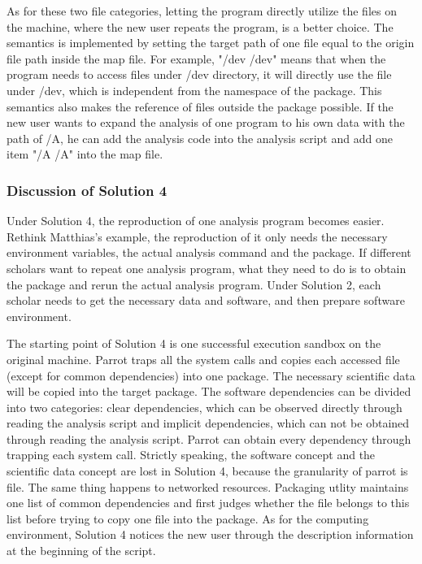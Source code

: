 \documentclass{acm_proc_article-sp}
\begin{document}
As for these two file categories, letting
the program directly utilize the files on the machine, where the new user
repeats the program, is a better choice. The semantics is implemented by
setting the target path of one file equal to the origin file path inside the
map file. For example, "/dev /dev" means that when the program needs to access
files under /dev directory, it will directly use the file under /dev, which is
independent from the namespace of the package. This semantics also makes the
reference of files outside the package possible. If the new user wants to
expand the analysis of one program to his own data with the path of /A, he can add the analysis
code into the analysis script and add one item "/A /A" into the map file.


\subsubsection{Discussion of Solution 4} 

Under Solution 4, the reproduction of one analysis program becomes easier.
Rethink Matthias's example, the reproduction of it only needs
the necessary environment variables, the actual analysis command
and the package. If different scholars want to repeat one analysis program,
what they need to do is to obtain the package and rerun the actual analysis
program. Under Solution 2, each scholar needs to get the necessary data and
software, and then prepare software environment. 

The starting point of Solution 4 is one successful execution sandbox on the original machine. 
Parrot traps all the system calls and copies each accessed file (except for common dependencies) into one package.
The necessary scientific data will be copied into the target package.
The software dependencies can be divided into two categories: clear dependencies, which can be observed directly through reading the analysis script and implicit dependencies,
which can not be obtained through reading the analysis script. 
Parrot can obtain every dependency through trapping each system call.
Strictly speaking, the software concept and the scientific data concept are lost in Solution 4, because
the granularity of parrot is file.
The same thing happens to networked resources.
Packaging utlity maintains one list of common dependencies and first judges whether the file belongs to this list before trying to copy one file into the package.
As for the computing environment, Solution 4 notices the new user through the description information at the beginning of the script.
\end{document}
